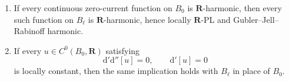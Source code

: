 \begin{proposition}
\begin{enumerate}
pluriharmonic, then every such function on $B_\ell$ is classically
pluriharmonic.
\item If every continuous zero-current function on $B_0$ is
$\mathbf R$-harmonic, then every such function on $B_\ell$ is
$\mathbf R$-harmonic, hence locally $\mathbf R$-PL and
Gubler--Jell--Rabinoff harmonic.
\item If every $u\in C^0(B_0,\mathbf R)$ satisfying
\[
             \mathrm d'\mathrm d''[u]=0,
             \qquad \mathrm d'[u]=0
\]
is locally constant, then the same implication holds with $B_\ell$ in
place of $B_0$.
\end{enumerate}
\end{proposition}
